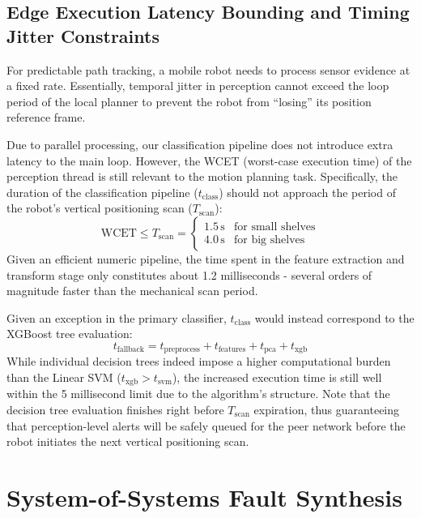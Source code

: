 \subsection{Edge Execution Latency Bounding and Timing Jitter Constraints}

For predictable path tracking, a mobile robot needs to process sensor evidence at a fixed rate. Essentially, temporal jitter in perception cannot exceed the loop period of the local planner to prevent the robot from “losing” its position reference frame.

Due to parallel processing, our classification pipeline does not introduce extra latency to the main loop. However, the WCET (worst-case execution time) of the perception thread is still relevant to the motion planning task. Specifically, the duration of the classification pipeline ($t_{\text{class}}$) should not approach the period of the robot's vertical positioning scan ($T_{\text{scan}}$):
\begin{equation} \text{WCET} \le T_{\text{scan}} = \begin{cases} 1.5\,\text{s} & \text{for small shelves} \\ 4.0\,\text{s} & \text{for big shelves} \end{cases} \label{eq:wcet_climb_bounds} \end{equation}
Given an efficient numeric pipeline, the time spent in the feature extraction and transform stage only constitutes about 1.2 milliseconds - several orders of magnitude faster than the mechanical scan period.

Given an exception in the primary classifier, $t_{\text{class}}$ would instead correspond to the XGBoost tree evaluation:
\begin{equation} t_{\text{fallback}} = t_{\text{preprocess}} + t_{\text{features}} + t_{\text{pca}} + t_{\text{xgb}} \label{eq:fallback_processing_time} \end{equation}
While individual decision trees indeed impose a higher computational burden than the Linear SVM ($t_{\text{xgb}} > t_{\text{svm}}$), the increased execution time is still well within the 5 millisecond limit due to the algorithm's structure. Note that the decision tree evaluation finishes right before $T_{\text{scan}}$ expiration, thus guaranteeing that perception-level alerts will be safely queued for the peer network before the robot initiates the next vertical positioning scan.

\section{System-of-Systems Fault Synthesis}

